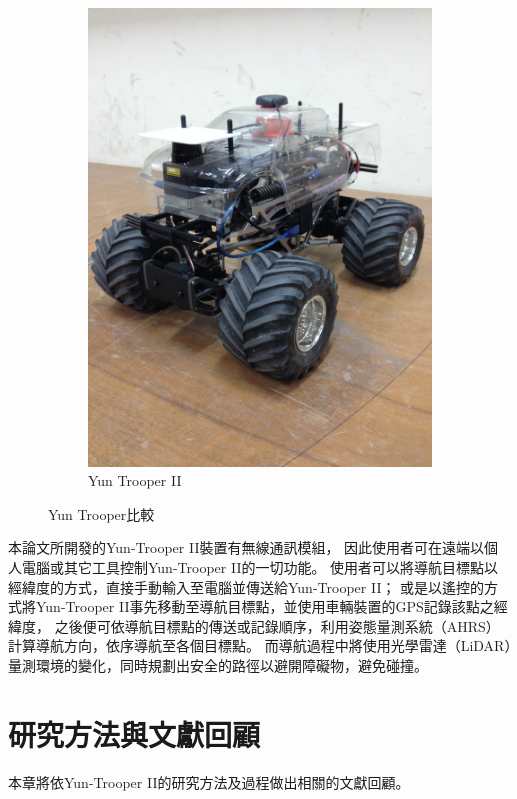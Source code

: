 \begin{figure}[h!]
\begin{subfigure}[b]{0.45\textwidth}
		\includegraphics[width=\textwidth]{figures/YunTrooperII}
		\caption{Yun Trooper II}
		\label{f:YunTrooperII}
	\end{subfigure}
	\caption{Yun Trooper比較}
\end{figure}

本論文所開發的Yun-Trooper II裝置有無線通訊模組，
因此使用者可在遠端以個人電腦或其它工具控制Yun-Trooper II的一切功能。
使用者可以將導航目標點以經緯度的方式，直接手動輸入至電腦並傳送給Yun-Trooper II；
或是以遙控的方式將Yun-Trooper II事先移動至導航目標點，並使用車輛裝置的GPS記錄該點之經緯度，
之後便可依導航目標點的傳送或記錄順序，利用姿態量測系統（AHRS）計算導航方向，依序導航至各個目標點。
而導航過程中將使用光學雷達（LiDAR）量測環境的變化，同時規劃出安全的路徑以避開障礙物，避免碰撞。

\section{研究方法與文獻回顧}
本章將依Yun-Trooper II的研究方法及過程做出相關的文獻回顧。

